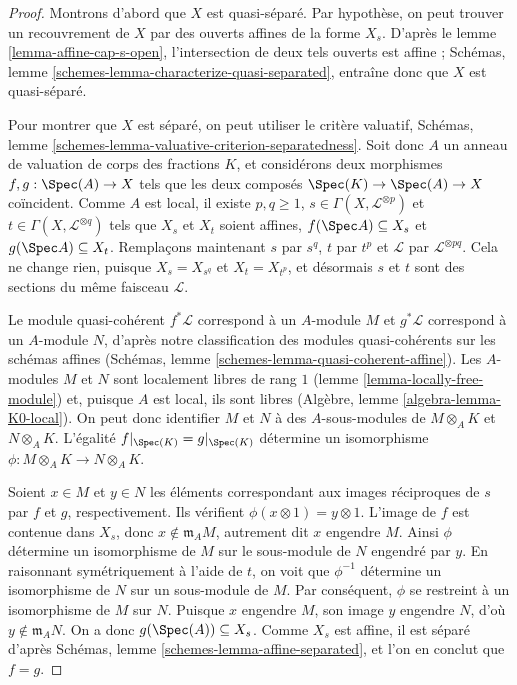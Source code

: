 \begin{proof}
Montrons d'abord que $X$ est quasi-séparé. Par hypothèse, on
peut trouver un recouvrement de $X$ par des ouverts affines de la forme
$X_s$. D'après le lemme \ref{lemma-affine-cap-s-open},
l'intersection de deux tels ouverts est affine ; Schémas, lemme
\ref{schemes-lemma-characterize-quasi-separated}, entraîne donc
que $X$ est quasi-séparé.

\medskip\noindent
Pour montrer que $X$ est séparé, on peut utiliser le critère
valuatif, Schémas, lemme
\ref{schemes-lemma-valuative-criterion-separatedness}.
Soit donc $A$ un anneau de valuation de corps des fractions $K$,
et considérons deux morphismes $f, g : \Spec(A) \to X$ tels que
les deux composés $\Spec(K) \to \Spec(A) \to X$ coïncident.
Comme $A$ est local, il existe $p, q \ge 1$, $s \in \Gamma(X,
\mathcal{L}^{\otimes p})$ et $t \in \Gamma(X,
\mathcal{L}^{\otimes q})$ tels que $X_s$ et $X_t$ soient
affines, $f(\Spec A) \subseteq X_s$ et $g(\Spec A)
\subseteq X_t$. Remplaçons maintenant $s$ par $s^q$, $t$ par $t^p$
et $\mathcal{L}$ par $\mathcal{L}^{\otimes pq}$. Cela ne change
rien, puisque $X_s = X_{s^q}$ et $X_t = X_{t^p}$, et désormais $s$
et $t$ sont des sections du même faisceau $\mathcal{L}$.

\medskip\noindent
Le module quasi-cohérent $f^*\mathcal{L}$ correspond à un $A$-module $M$ et
$g^*\mathcal{L}$ correspond à un $A$-module $N$, d'après notre
classification des modules quasi-cohérents sur les schémas affines
(Schémas, lemme \ref{schemes-lemma-quasi-coherent-affine}).
Les $A$-modules $M$ et $N$ sont localement libres de rang
$1$ (lemme \ref{lemma-locally-free-module}) et, puisque $A$ est
local, ils sont libres (Algèbre, lemme
\ref{algebra-lemma-K0-local}). On peut donc identifier
$M$ et $N$ à des $A$-sous-modules de $M \otimes_A K$ et $N
\otimes_A K$. L'égalité $f|_{\Spec(K)} = g|_{\Spec(K)}$
détermine un isomorphisme $\phi \colon M \otimes_A K \to N
\otimes_A K$.

\medskip\noindent
Soient $x \in M$ et $y \in N$ les éléments correspondant aux
images réciproques de $s$ par $f$ et $g$, respectivement. Ils
vérifient $\phi(x \otimes 1) = y \otimes 1$. L'image de $f$
est contenue dans $X_s$, donc $x \not\in \mathfrak{m}_A M$,
autrement dit $x$ engendre $M$. Ainsi $\phi$ détermine un
isomorphisme de $M$ sur le sous-module de $N$ engendré par
$y$. En raisonnant symétriquement à l'aide de $t$, on voit que $\phi^{-1}$
détermine un isomorphisme de $N$ sur un sous-module de $M$.
Par conséquent, $\phi$ se restreint à un isomorphisme de $M$ sur
$N$. Puisque $x$ engendre $M$, son image $y$ engendre
$N$, d'où $y \not\in \mathfrak{m}_A N$. On a donc
$g(\Spec(A)) \subseteq X_s$. Comme $X_s$ est affine, il est
séparé d'après Schémas, lemme \ref{schemes-lemma-affine-separated},
et l'on en conclut que $f = g$.
\end{proof}

